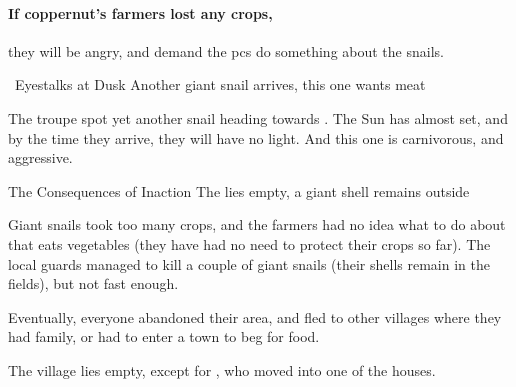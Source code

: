 \paragraph{If \gls{coppernut}'s farmers lost any crops,}
they will be angry, and demand the \glspl{pc} do something about the snails.

{~Eyestalks at Dusk}%
{Another giant snail arrives, this one wants meat}%

The troupe spot yet another snail heading towards .
The Sun has almost set, and by the time they arrive, they will have no light.
And this one is carnivorous, and aggressive.

{The Consequences of Inaction}%
{The  lies empty, a giant shell remains outside}%

Giant snails took too many crops, and the farmers had no idea what to do about  that eats vegetables (they have had no need to protect their crops so far).
The local \glspl{guard} managed to kill a couple of giant snails (their shells remain in the fields), but not fast enough.

Eventually, everyone abandoned their area, and fled to other \glspl{village} where they had family, or had to enter a town to beg for food.

The \gls{village} lies empty, except for , who moved into one of the houses.

\chitincrawler

